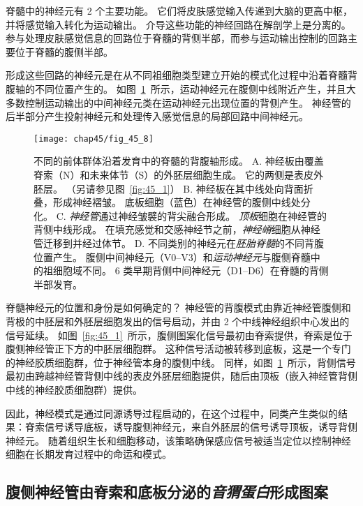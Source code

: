 脊髓中的神经元有 2 个主要功能。
它们将皮肤感觉输入传递到大脑的更高中枢，并将感觉输入转化为运动输出。
介导这些功能的神经回路在解剖学上是分离的。
参与处理皮肤感觉信息的回路位于脊髓的背侧半部，而参与运动输出控制的回路主要位于脊髓的腹侧半部。


形成这些回路的神经元是在从不同祖细胞类型建立开始的模式化过程中沿着脊髓背腹轴的不同位置产生的。
如图~\ref{fig:45_8}~所示，运动神经元在腹侧中线附近产生，并且大多数控制运动输出的中间神经元类在运动神经元出现位置的背侧产生。
神经管的后半部分产生投射神经元和处理传入感觉信息的局部回路中间神经元。


\begin{figure}[htbp]
	\centering
	\texttt{[image: chap45/fig\_45\_8]}
	\caption{不同的前体群体沿着发育中的脊髓的背腹轴形成。
		A. 神经板由覆盖脊索（N）和未来体节（S）的外胚层细胞生成。
		它的两侧是表皮外胚层。
		（另请参见图~\ref{fig:45_1}）
		B. 神经板在其中线处向背面折叠，形成神经褶皱。
		底板细胞（蓝色）在神经管的腹侧中线处分化。
		C. \textit{神经管}通过神经皱襞的背尖融合形成。
		\textit{顶板}细胞在神经管的背侧中线形成。
		在填充感觉和交感神经节之前，\textit{神经嵴}细胞从神经管迁移到并经过体节。
		D. 不同类别的神经元在\textit{胚胎脊髓}的不同背腹位置产生。
		腹侧中间神经元（V0–V3）和\textit{运动神经元}与腹侧脊髓中的祖细胞域不同。
		6 类早期背侧中间神经元（D1–D6）在脊髓的背侧半部发育\cite{goulding2002formation}。}
	\label{fig:45_8}
\end{figure}


脊髓神经元的位置和身份是如何确定的？
神经管的背腹模式由靠近神经管腹侧和背极的中胚层和外胚层细胞发出的信号启动，并由 2 个中线神经组织中心发出的信号延续。
如图~\ref{fig:45_1}~所示，腹侧图案化信号最初由脊索提供，脊索是位于腹侧神经管正下方的中胚层细胞群。
这种信号活动被转移到底板，这是一个专门的神经胶质细胞群，位于神经管本身的腹侧中线。
同样，如图~\ref{fig:45_8}~所示，背侧信号最初由跨越神经管背侧中线的表皮外胚层细胞提供，随后由顶板（嵌入神经管背侧中线的神经胶质细胞群）提供。


因此，神经模式是通过同源诱导过程启动的，在这个过程中，同类产生类似的结果：脊索信号诱导底板，诱导腹侧神经元，来自外胚层的信号诱导顶板，诱导背侧神经元。
随着组织生长和细胞移动，该策略确保感应信号被适当定位以控制神经细胞在长期发育过程中的命运和模式。



\subsection{腹侧神经管由脊索和底板分泌的\textit{音猬蛋白}形成图案}

